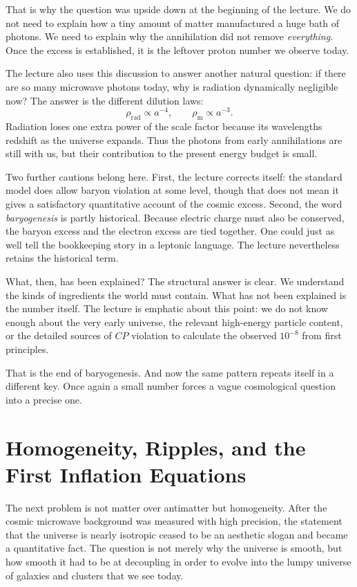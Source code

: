 That is why the question was upside down at the beginning of the lecture. We do not need to explain how a tiny amount of matter manufactured a huge bath of photons. We need to explain why the annihilation did not remove \emph{everything}. Once the excess is established, it is the leftover proton number we observe today.

The lecture also uses this discussion to answer another natural question: if there are so many microwave photons today, why is radiation dynamically negligible now? The answer is the different dilution laws:
\begin{equation}
\rho_{\mathrm{rad}}\propto a^{-4},
\qquad
\rho_{\mathrm{m}}\propto a^{-3}.
\end{equation}
Radiation loses one extra power of the scale factor because its wavelengths redshift as the universe expands. Thus the photons from early annihilations are still with us, but their contribution to the present energy budget is small.

Two further cautions belong here. First, the lecture corrects itself: the standard model does allow baryon violation at some level, though that does not mean it gives a satisfactory quantitative account of the cosmic excess. Second, the word \emph{baryogenesis} is partly historical. Because electric charge must also be conserved, the baryon excess and the electron excess are tied together. One could just as well tell the bookkeeping story in a leptonic language. The lecture nevertheless retains the historical term.

What, then, has been explained? The structural answer is clear. We understand the kinds of ingredients the world must contain. What has not been explained is the number itself. The lecture is emphatic about this point: we do not know enough about the very early universe, the relevant high-energy particle content, or the detailed sources of \(CP\) violation to calculate the observed \(10^{-8}\) from first principles.

That is the end of baryogenesis. And now the same pattern repeats itself in a different key. Once again a small number forces a vague cosmological question into a precise one.

\section{Homogeneity, Ripples, and the First Inflation Equations}

The next problem is not matter over antimatter but homogeneity. After the cosmic microwave background was measured with high precision, the statement that the universe is nearly isotropic ceased to be an aesthetic slogan and became a quantitative fact. The question is not merely why the universe is smooth, but how smooth it had to be at decoupling in order to evolve into the lumpy universe of galaxies and clusters that we see today.

